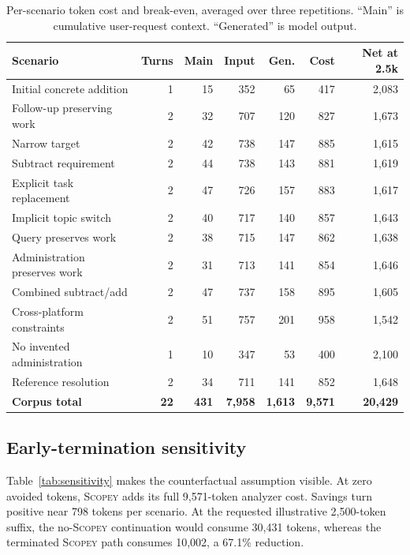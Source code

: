 \documentclass[10pt]{article}
\newcommand{\scopey}{\textsc{Scopey}\xspace}
\begin{document}
\clearpage
\begin{table}[ht]
\centering
\caption{Per-scenario token cost and break-even, averaged over three repetitions.
``Main'' is cumulative user-request context. ``Generated'' is model output.}
\label{tab:scenarios}
\small
\begin{tabularx}{\textwidth}{@{}Xrrrrrr@{}}
\toprule
Scenario & Turns & Main & Input & Gen. & Cost & Net at 2.5k \\
\midrule
Initial concrete addition & 1 & 15 & 352 & 65 & 417 & 2,083 \\
Follow-up preserving work & 2 & 32 & 707 & 120 & 827 & 1,673 \\
Narrow target & 2 & 42 & 738 & 147 & 885 & 1,615 \\
Subtract requirement & 2 & 44 & 738 & 143 & 881 & 1,619 \\
Explicit task replacement & 2 & 47 & 726 & 157 & 883 & 1,617 \\
Implicit topic switch & 2 & 40 & 717 & 140 & 857 & 1,643 \\
Query preserves work & 2 & 38 & 715 & 147 & 862 & 1,638 \\
Administration preserves work & 2 & 31 & 713 & 141 & 854 & 1,646 \\
Combined subtract/add & 2 & 47 & 737 & 158 & 895 & 1,605 \\
Cross-platform constraints & 2 & 51 & 757 & 201 & 958 & 1,542 \\
No invented administration & 1 & 10 & 347 & 53 & 400 & 2,100 \\
Reference resolution & 2 & 34 & 711 & 141 & 852 & 1,648 \\
\midrule
\textbf{Corpus total} & \textbf{22} & \textbf{431} & \textbf{7,958} &
\textbf{1,613} & \textbf{9,571} & \textbf{20,429} \\
\bottomrule
\end{tabularx}
\end{table}

\subsection{Early-termination sensitivity}

Table~\ref{tab:sensitivity} makes the counterfactual assumption visible. At
zero avoided tokens, \scopey adds its full 9,571-token analyzer cost. Savings
turn positive near 798 tokens per scenario. At the requested illustrative
2,500-token suffix, the no-\scopey continuation would consume 30,431 tokens,
whereas the terminated \scopey path consumes 10,002, a 67.1\% reduction.
\end{document}
